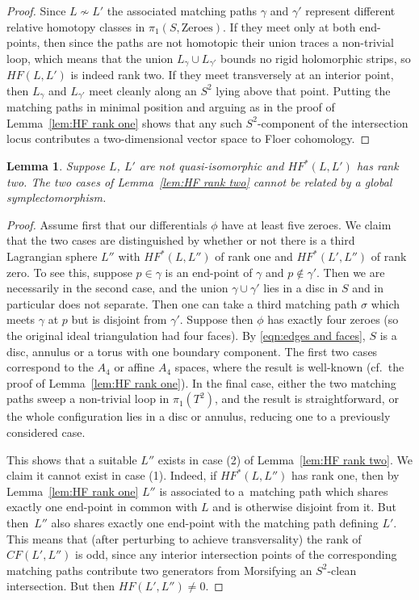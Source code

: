 \documentclass[pdftex]{sigma}
\newtheorem{lem}[thm]{Lemma}
\theoremstyle{definition}
\numberwithin{equation}{section}
\begin{document}
\begin{proof}
Since $L \not\sim L'$ the associated matching paths $\gamma$ and $\gamma'$ represent different relative homotopy classes in $\pi_1(S,\mathrm{Zeroes})$. If they meet only at both end-points, then since the paths are not homotopic their union traces a non-trivial loop, which means that the union $L_{\gamma} \cup L_{\gamma'}$ bounds no rigid holomorphic strips, so $HF(L,L')$ is indeed rank two. If they meet transversely at an interior point, then $L_{\gamma}$ and $L_{\gamma'}$ meet cleanly along an $S^2$ lying above that point. Putting the matching paths in minimal position and arguing as in the proof of Lemma~\ref{lem:HF rank one} shows that any such $S^2$-component of the intersection locus contributes a two-dimensional vector space to Floer cohomology.
\end{proof}


\begin{lem}\label{lem:two cases}
Suppose $L$, $L'$ are not quasi-isomorphic and $HF^*(L,L')$ has rank two. The two cases of Lemma~{\rm \ref{lem:HF rank two}} cannot be related by a global symplectomorphism.
\end{lem}

\begin{proof}
Assume first that our differentials $\phi$ have at least five zeroes. We claim that the two cases are distinguished by whether or not there is a third Lagrangian sphere $L''$ with $HF^*(L,L'')$ of rank one and $HF^*(L',L'')$ of rank zero. To see this, suppose
$p \in \gamma$ is an end-point of $\gamma$ and $p\not\in \gamma'$. Then we are necessarily in the second case, and the union $\gamma \cup \gamma'$ lies in a disc in $S$ and in particular does not separate. Then one can take a third matching path $\sigma$ which meets $\gamma$ at $p$ but is disjoint from $\gamma'$. Suppose then $\phi$ has exactly four zeroes (so the original ideal triangulation had four faces). By \eqref{eqn:edges and faces}, $S$ is a disc, annulus or a torus with one boundary component. The first two cases correspond to the $A_4$ or affine $A_4$ spaces, where the result is well-known (cf.~the proof of Lemma~\ref{lem:HF rank one}). In the final case, either the two matching paths sweep a non-trivial loop in $\pi_1(T^2)$, and the result is straightforward, or the whole configuration lies in a disc or annulus, reducing one to a previously considered case.

This shows that a suitable $L''$ exists in case (2) of Lemma~\ref{lem:HF rank two}. We claim it cannot exist in case (1). Indeed, if $HF^*(L,L'')$ has rank one, then by Lemma~\ref{lem:HF rank one} $L''$ is associated to a~matching path which shares exactly one end-point in common with $L$ and is otherwise disjoint from it. But then~$L''$ also shares exactly one end-point with the matching path defining $L'$. This means that (after perturbing to achieve transversality) the rank of ${CF}(L',L'')$ is odd, since any interior intersection points of the corresponding matching paths contribute two generators from Morsifying an $S^2$-clean intersection. But then $HF(L',L'') \neq 0$.
\end{proof}
\end{document}

